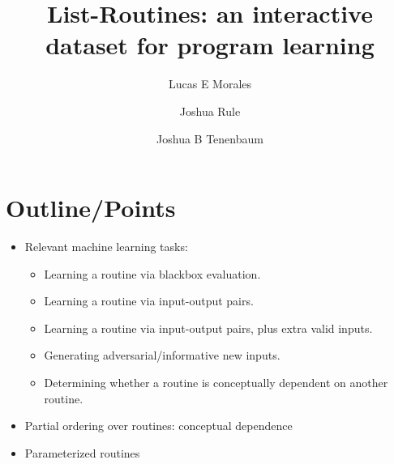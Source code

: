\documentclass[11pt]{article}
\title{List-Routines: an interactive dataset for program learning}
\author{Lucas E Morales \and Joshua Rule \and Joshua B Tenenbaum}
\begin{document}
\maketitle

\section{Outline/Points}
\begin{itemize}
  \item Relevant machine learning tasks:
    \begin{itemize}
      \item Learning a routine via blackbox evaluation.
      \item Learning a routine via input-output pairs.
      \item Learning a routine via input-output pairs, plus extra valid inputs.
      \item Generating adversarial/informative new inputs.
      \item Determining whether a routine is conceptually dependent on another routine.
    \end{itemize}
  \item Partial ordering over routines: conceptual dependence
  \item Parameterized routines
\end{itemize}
\end{document}
